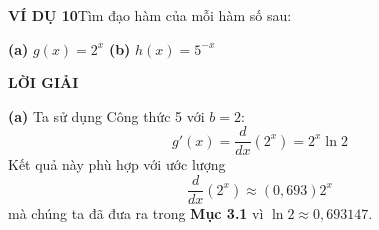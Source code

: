 \begin{minipage}[t]{0.70\textwidth}
\vspace{0.25cm}
\noindent
\parbox{\linewidth}{%
  \makebox[0pt][l]{\raisebox{-0.5\height}{\tcbox[colframe=stewartred,colback=white,boxrule=1pt,sharp corners,top=3pt,bottom=3pt,left=6pt,right=6pt]{\textbf{\textcolor{stewartred}{\normalsize 5}}}}}%
  \hfill
  \hfill\null
}
\vspace{0.35cm}

\noindent\textbf{\textsf{\textcolor{stewartcyan}{VÍ DỤ 10}}}\quad Tìm đạo hàm của mỗi hàm số sau:
\vspace{0.15cm}

\noindent
\textbf{(a)} $g(x) = 2^x$ \qquad\qquad\qquad \textbf{(b)} $h(x) = 5^{-x}$

\vspace{0.25cm}
\noindent\textbf{\textsf{\textcolor{stewartcyan}{LỜI GIẢI}}}
\vspace{0.1cm}

\noindent
\textbf{(a)} Ta sử dụng Công thức 5 với $b = 2$:
\[
g'(x) = \frac{d}{dx}(2^x) = 2^x \ln 2
\]
Kết quả này phù hợp với ước lượng
\[
\frac{d}{dx}(2^x) \approx (0{,}693)2^x
\]
mà chúng ta đã đưa ra trong \textbf{\textsf{Mục 3.1}} vì $\ln 2 \approx 0{,}693147$.

\end{minipage}
